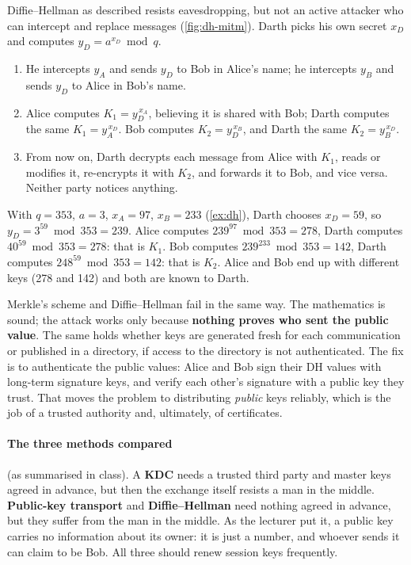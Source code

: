 Diffie--Hellman as described resists eavesdropping, but not an active attacker who can intercept and replace messages (\cref{fig:dh-mitm}). Darth picks his own secret $x_D$ and computes $y_D = a^{x_D} \bmod q$.
\begin{enumerate}
    \item He intercepts $y_A$ and sends $y_D$ to Bob in Alice's name; he intercepts $y_B$ and sends $y_D$ to Alice in Bob's name.
    \item Alice computes $K_1 = y_D^{\,x_A}$, believing it is shared with Bob; Darth computes the same $K_1 = y_A^{\,x_D}$. Bob computes $K_2 = y_D^{\,x_B}$, and Darth the same $K_2 = y_B^{\,x_D}$.
    \item From now on, Darth decrypts each message from Alice with $K_1$, reads or modifies it, re-encrypts it with $K_2$, and forwards it to Bob, and vice versa. Neither party notices anything.
\end{enumerate}

\begin{example}
With $q = 353$, $a = 3$, $x_A = 97$, $x_B = 233$ (\cref{ex:dh}), Darth chooses $x_D = 59$, so $y_D = 3^{59} \bmod 353 = 239$. Alice computes $239^{97} \bmod 353 = 278$, Darth computes $40^{59} \bmod 353 = 278$: that is $K_1$. Bob computes $239^{233} \bmod 353 = 142$, Darth computes $248^{59} \bmod 353 = 142$: that is $K_2$. Alice and Bob end up with different keys (278 and 142) and both are known to Darth.
\end{example}

\begin{remark}
Merkle's scheme and Diffie--Hellman fail in the same way. The mathematics is sound; the attack works only because \textbf{nothing proves who sent the public value}. The same holds whether keys are generated fresh for each communication or published in a directory, if access to the directory is not authenticated. The fix is to authenticate the public values: Alice and Bob sign their DH values with long-term signature keys, and verify each other's signature with a public key they trust. That moves the problem to distributing \emph{public} keys reliably, which is the job of a trusted authority and, ultimately, of certificates.
\end{remark}

\paragraph{The three methods compared} (as summarised in class). A \textbf{KDC} needs a trusted third party and master keys agreed in advance, but then the exchange itself resists a man in the middle. \textbf{Public-key transport} and \textbf{Diffie--Hellman} need nothing agreed in advance, but they suffer from the man in the middle. As the lecturer put it, a public key carries no information about its owner: it is just a number, and whoever sends it can claim to be Bob. All three should renew session keys frequently.


